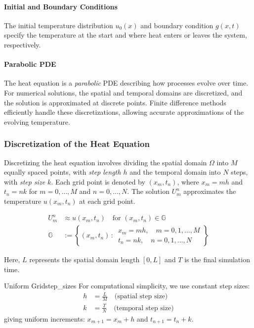 \paragraph{Initial and Boundary Conditions}
The initial temperature distribution \(u_0(x)\) and boundary condition \(g(x, t)\) specify the temperature at the start and where heat enters or leaves the system, respectively.

\paragraph{Parabolic PDE}
The heat equation is a \emph{parabolic} PDE describing how processes evolve over time. For numerical solutions, the spatial and temporal domains are discretized, and the solution is approximated at discrete points. Finite difference methods efficiently handle these discretizations, allowing accurate approximations of the evolving temperature.

\subsubsection{Discretization of the Heat Equation}
Discretizing the heat equation involves dividing the spatial domain \(\Omega\) into \(M\) equally spaced points, with \emph{step length \(h\)} and the temporal domain into \(N\) steps, with \emph{step size \(k\)}.
Each grid point is denoted by \((x_m, t_n)\), where \(x_m = m h\) and \(t_n = n k\) for \(m = 0, \ldots, M\) and \(n = 0, \ldots, N\). The solution \(U_m^n\) approximates the temperature \(u(x_m, t_n)\) at each grid point.

\begin{align*}
  U_m^n      & \approx u(x_m, t_n) \quad \text{for } (x_m, t_n) \in \mathbb{G} \\[1em]
  \mathbb{G} & := \left\{(x_m, t_n) \,:\,
  \begin{array}{l}
    x_m = m h, \quad m = 0, 1, \ldots, M \\
    t_n = n k, \quad n = 0, 1, \ldots, N
  \end{array}
  \right\}
\end{align*}\label{eq:grid_points}

Here, $L$ represents the spatial domain length $[0,L]$ and $T$ is the final simulation time.

\begin{remark}{Uniform Grid}{step_sizes}
  For computational simplicity, we use constant step sizes:
  \begin{align*}
    h & = \frac{L}{M} \quad \text{(spatial step size)}  \\
    k & = \frac{T}{N} \quad \text{(temporal step size)}
  \end{align*}
  giving uniform increments: $x_{m+1} = x_m + h$ and $t_{n+1} = t_n + k$.
\end{remark}

